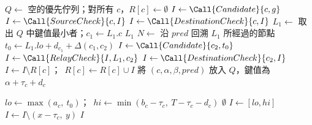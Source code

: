 \begin{algorithm}[htbp]
\caption{以區間 Label 搜尋最早到達}
\label{alg:search}
\begin{algorithmic}[1]
  \State $Q \gets$ 空的優先佇列；對所有 $c$，$R[c] \gets \emptyset$ 
    \State $I \gets \Call{Candidate}{c, g}$ 
    \State $I \gets \Call{SourceCheck}{c, I}$ 
     \State $I \gets \Call{DestinationCheck}{c, I}$ \EndIf
    \State {}
  \EndFor
    \State $L_1 \gets$ 取出 $Q$ 中鍵值最小者；$c_1 \gets L_1.c$
     \State \Return $L_1$ \EndIf
    \State $N \gets$ 沿 $\mathit{pred}$ 回溯 $L_1$ 所經過的節點
      \State $t_0 \gets L_1.\mathit{lo} + d_{c_1} + \Delta(c_1, c_2)$ 
      \State $I \gets \Call{Candidate}{c_2, t_0}$
      \State $I \gets \Call{RelayCheck}{I, L_1, c_2}$ 
       \State $I \gets \Call{DestinationCheck}{c_2, I}$ \EndIf
      \State {}
    \EndFor
  \EndWhile
  \State \Return \Nil
\EndFunction
\Statex
{}
  \State $I \gets I \setminus R[c]$；\ $R[c] \gets R[c] \cup I$
   
    \State 將 $(c,\alpha,\beta,\mathit{pred})$ 放入 $Q$，鍵值為 $\alpha + \tau_c + d_c$
  \EndFor
\EndFunction
\end{algorithmic}
\end{algorithm}

\begin{algorithm}[htbp]
\caption{連線的可開始傳送時間（不含 Buffer）}
\label{alg:candidate}
\begin{algorithmic}[1]
  \State $\mathit{lo} \gets \max(a_c,\ t_0)$；\ $\mathit{hi} \gets \min(b_c - \tau_c,\ T - \tau_c - d_c)$
   \State \Return $\emptyset$ \EndIf
  \State $I \gets [\mathit{lo}, \mathit{hi}]$
    \State $I \gets I \setminus (x - \tau_c,\ y)$ 
  \EndFor
  \State \Return $I$
\EndFunction
\end{algorithmic}
\end{algorithm}


